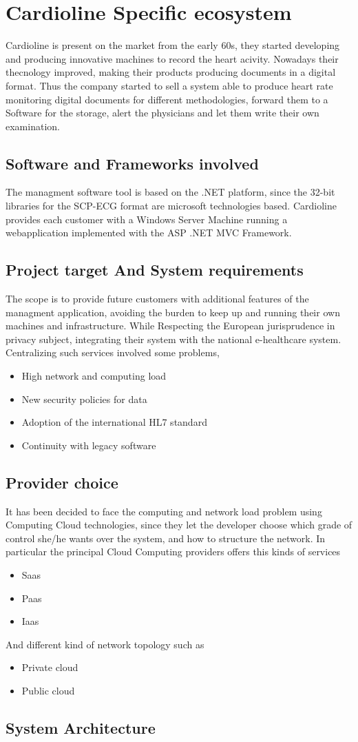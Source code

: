 \chapter{Cardioline Specific ecosystem}
Cardioline is present on the market from the early 60s, they started developing and producing innovative machines to record the heart acivity. Nowadays their thecnology improved, making their products producing documents in a digital format.
Thus the company started to sell a system able to produce heart rate monitoring digital documents for different methodologies, forward them to a Software for the storage, alert the physicians and let them write their own examination.
\section{Software and Frameworks involved}
The managment software tool is based on the .NET platform, since the 32-bit libraries for the SCP-ECG format are microsoft technologies based.
Cardioline provides each customer with a Windows Server Machine running a webapplication implemented with the ASP .NET MVC Framework.
\section{Project target And System requirements}
The scope is to provide future customers with additional features of the managment application, avoiding the burden to keep up and running their own machines and infrastructure.
While Respecting the European jurisprudence in privacy subject, integrating their system with the national e-healthcare system.
Centralizing such services involved some problems,
\begin{itemize}
    \item High network and computing load
    \item New security policies for data
    \item Adoption of the international HL7 standard
    \item Continuity with legacy software
\end{itemize}
\section{Provider choice}
It has been decided to face the computing and network load problem using Computing Cloud technologies, since they let the developer choose which grade of control she/he wants over the system, and how to structure the network.
In particular the principal Cloud Computing providers offers this kinds of services
\begin{itemize}
    \item Saas
    \item Paas
    \item Iaas
\end{itemize}
And different kind of network topology such as
\begin{itemize}
    \item Private cloud
    \item Public cloud
\end{itemize}

\section{System Architecture}